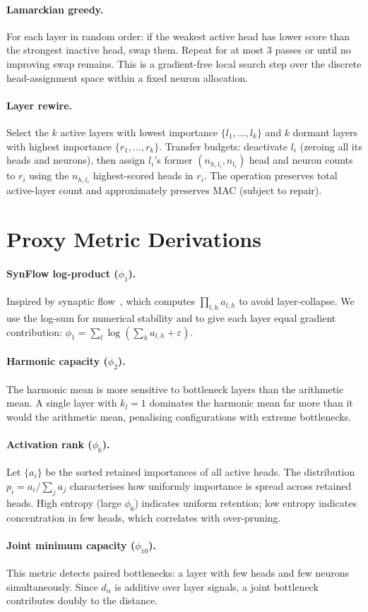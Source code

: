 \documentclass{article}
\newcommand{\dblend}{d_{\alpha}}
\begin{document}
\paragraph{Lamarckian greedy.}
For each layer in random order: if the weakest active head has lower
score than the strongest inactive head, swap them.  Repeat for at most
3 passes or until no improving swap remains.  This is a gradient-free
local search step over the discrete head-assignment space within a
fixed neuron allocation.

\paragraph{Layer rewire.}
Select the $k$ active layers with lowest importance
$\{l_1,\ldots,l_k\}$ and $k$ dormant layers with highest importance
$\{r_1,\ldots,r_k\}$.  Transfer budgets: deactivate $l_i$ (zeroing
all its heads and neurons), then assign $l_i$'s former
$(n_{h,l_i}, n_{l_i})$ head and neuron counts to $r_i$ using the
$n_{h,l_i}$ highest-scored heads in $r_i$.  The operation preserves
total active-layer count and approximately preserves MAC (subject to
repair).

\section{Proxy Metric Derivations}
\label{app:proxies}

\paragraph{SynFlow log-product ($\phi_1$).}
Inspired by synaptic flow~\citep{tanaka2020pruning}, which computes
$\prod_{l,h} a_{l,h}$ to avoid layer-collapse.  We use the log-sum
for numerical stability and to give each layer equal gradient contribution:
$\phi_1 = \sum_l \log(\sum_h a_{l,h} + \varepsilon)$.

\paragraph{Harmonic capacity ($\phi_2$).}
The harmonic mean is more sensitive to bottleneck layers than the
arithmetic mean.  A single layer with $k_l=1$ dominates the harmonic
mean far more than it would the arithmetic mean, penalising
configurations with extreme bottlenecks.

\paragraph{Activation rank ($\phi_6$).}
Let $\{a_i\}$ be the sorted retained importances of all active heads.
The distribution $p_i = a_i/\sum_j a_j$ characterises how uniformly
importance is spread across retained heads.  High entropy (large
$\phi_6$) indicates uniform retention; low entropy indicates
concentration in few heads, which correlates with over-pruning.

\paragraph{Joint minimum capacity ($\phi_{10}$).}
This metric detects paired bottlenecks: a layer with few heads and few
neurons simultaneously.  Since $\dblend$ is additive over layer
signals, a joint bottleneck contributes doubly to the distance.
\end{document}
